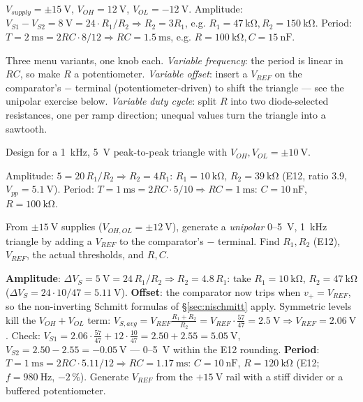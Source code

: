 \documentclass[11pt,a4paper,oneside]{book}
\begin{document}
\begin{wexample}
$V_{supply}=\pm\qty{15}{\volt}$, $V_{OH}=\qty{12}{\volt}$, $V_{OL}=\qty{-12}{\volt}$.
Amplitude: $V_{S1}-V_{S2}=\qty{8}{\volt}=24\cdot R_1/R_2\Rightarrow
R_2=3R_1$, e.g. $R_1=\qty{47}{\kilo\ohm},R_2=\qty{150}{\kilo\ohm}$. Period:
$T=\qty{2}{\milli\second}=2RC\cdot8/12\Rightarrow RC=\qty{1.5}{\milli\second}$,
e.g. $R=\qty{100}{\kilo\ohm},C=\qty{15}{\nano\farad}$.
\end{wexample}

\begin{note}
Three menu variants, one knob each. \emph{Variable frequency}: the
period is linear in $RC$, so make $R$ a potentiometer. \emph{Variable offset}:
insert a $V_{REF}$ on the comparator's $-$ terminal (potentiometer-driven) to
shift the triangle --- see the unipolar exercise below. \emph{Variable duty
cycle}: split $R$ into two diode-selected resistances, one per ramp direction;
unequal values turn the triangle into a sawtooth.
\end{note}

\begin{exercise}
Design for a \qty{1}{\kilo\hertz}, \qty{5}{\volt} peak-to-peak triangle with
$V_{OH},V_{OL}=\pm\qty{10}{\volt}$.
\end{exercise}
\begin{solution}
Amplitude: $5=20\,R_1/R_2\Rightarrow R_2=4R_1$: $R_1=\qty{10}{\kilo\ohm}$,
$R_2=\qty{39}{\kilo\ohm}$ (E12, ratio 3.9, $V_{pp}=\qty{5.1}{\volt}$).
Period: $T=\qty{1}{\milli\second}=2RC\cdot5/10\Rightarrow
RC=\qty{1}{\milli\second}$: $C=\qty{10}{\nano\farad}$, $R=\qty{100}{\kilo\ohm}$.
\end{solution}

\begin{exercise}
From $\pm\qty{15}{\volt}$ supplies ($V_{OH,OL}=\pm\qty{12}{\volt}$), generate
a \emph{unipolar} 0--\qty{5}{\volt}, \qty{1}{\kilo\hertz} triangle by adding a
$V_{REF}$ to the comparator's $-$ terminal. Find $R_1,R_2$ (E12), $V_{REF}$,
the actual thresholds, and $R,C$.
\end{exercise}
\begin{solution}
\textbf{Amplitude}: $\Delta V_S=\qty{5}{\volt}=24\,R_1/R_2\Rightarrow
R_2=4.8\,R_1$: take $R_1=\qty{10}{\kilo\ohm}$, $R_2=\qty{47}{\kilo\ohm}$
($\Delta V_S=24\cdot10/47=\qty{5.11}{\volt}$).
\textbf{Offset}: the comparator now trips when $v_+=V_{REF}$, so the
non-inverting Schmitt formulas of \S\ref{sec:nischmitt} apply. Symmetric
levels kill the $V_{OH}+V_{OL}$ term:
$V_{S,avg}=V_{REF}\frac{R_1+R_2}{R_2}=V_{REF}\cdot\frac{57}{47}
=\qty{2.5}{\volt}\Rightarrow V_{REF}=\qty{2.06}{\volt}$.
Check: $V_{S1}=2.06\cdot\frac{57}{47}+12\cdot\frac{10}{47}
=2.50+2.55=\qty{5.05}{\volt}$, $V_{S2}=2.50-2.55=\qty{-0.05}{\volt}$ ---
0--\qty{5}{\volt} within the E12 rounding.
\textbf{Period}: $T=\qty{1}{\milli\second}=2RC\cdot5.11/12\Rightarrow
RC=\qty{1.17}{\milli\second}$: $C=\qty{10}{\nano\farad}$,
$R=\qty{120}{\kilo\ohm}$ (E12; $f=\qty{980}{\hertz}$, $-2\,\%$).
Generate $V_{REF}$ from the $+\qty{15}{\volt}$ rail with a stiff divider or a
buffered potentiometer.
\end{solution}
\end{document}
